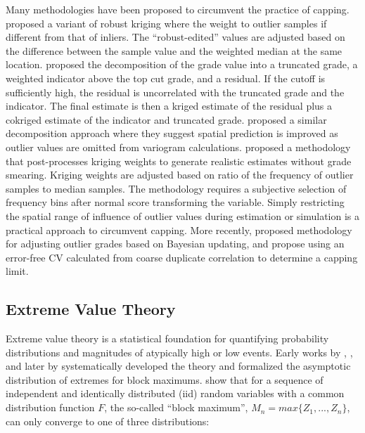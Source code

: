 Many methodologies have been proposed to circumvent the practice of capping. \cite{costa2003reducing} proposed a variant of robust kriging \citep{hawkins1984robust} where the weight to outlier samples if different from that of inliers. The ``robust-edited'' values are adjusted based on the difference between the sample value and the weighted median at the same location. \cite{rivoirard2013topcut} proposed the decomposition of the grade value into a truncated grade, a weighted indicator above the top cut grade, and a residual. If the cutoff is sufficiently high, the residual is uncorrelated with the truncated grade and the indicator. The final estimate is then a kriged estimate of the residual plus a cokriged estimate of the indicator and truncated grade. \cite{maleki2014capping} proposed a similar decomposition approach where they suggest spatial prediction is improved as outlier values are omitted from variogram calculations. \cite{fourie2019limiting} proposed a methodology that post-processes kriging weights to generate realistic estimates without grade smearing. Kriging weights are adjusted based on ratio of the frequency of outlier samples to median samples. The methodology requires a subjective selection of frequency bins after normal score transforming the variable. Simply restricting the spatial range of influence of outlier values during estimation or simulation is a practical approach to circumvent capping. More recently, \cite{silva2021classification} proposed methodology for adjusting outlier grades based on Bayesian updating, and \cite{dutaut2021new} propose using an error-free \gls{CV} calculated from coarse duplicate correlation to determine a capping limit.

\subsection{Extreme Value Theory}
\label{subsec:01evt}

Extreme value theory is a statistical foundation for quantifying probability distributions and magnitudes of atypically high or low events. Early works by \cite{frechet1927loi}, \cite{fisher1928limiting}, \cite{mises1936distribution} and later by \cite{gnedenko1943distribution}  systematically developed the theory and formalized the asymptotic distribution of extremes for block maximums. \cite{fisher1928limiting} show that for a sequence of independent and identically distributed (iid) random variables with a common distribution function $F$, the so-called ``block maximum'', $M_n = max\{Z_1,...,Z_n\}$, can only converge to one of three distributions:

